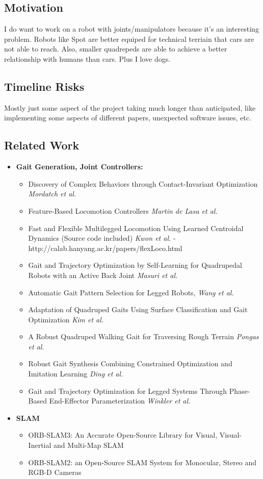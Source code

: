 \documentclass{article}
\theoremstyle{definition}
\theoremstyle{note}
\begin{document}
\subsection*{Motivation}
I do want to work on a robot with joints/manipulators because it's an interesting problem.
Robots like Spot are better equiped for technical terriain that cars are not able to reach. Also, 
smaller quadrepeds are able to achieve a better relationship with humans than cars.
Plus I love dogs.

\subsection*{Timeline Risks}
Mostly just some aspect of the project taking much longer than anticipated, like implementing some aspects
of different papers, unexpected software issues, etc.



\subsection*{Related Work}
\begin{itemize}
\item \textbf{Gait Generation, Joint Controllers:}
    \begin{itemize}
    \item Discovery of Complex Behaviors through Contact-Invariant Optimization \textit{Mordatch et al.}
    \item Feature-Based Locomotion Controllers \textit{Martin de Lasa et al.}
    \item Fast and Flexible Multilegged Locomotion Using Learned Centroidal Dynamics (Source code included) \textit{Kwon et al.} - http://calab.hanyang.ac.kr/papers/flexLoco.html
    \item Gait and Trajectory Optimization by Self-Learning for Quadrupedal Robots with an Active Back Joint \textit{Masuri et al.}
    \item Automatic  Gait  Pattern  Selection for  Legged  Robots, \textit{Wang et al.}
    \item Adaptation  of  Quadruped  Gaits  Using  Surface Classification  and  Gait  Optimization \textit{Kim et al.}
    \item A Robust Quadruped Walking Gait for  Traversing Rough Terrain \textit{Pongas et al.}
    \item Robust  Gait  Synthesis  Combining  Constrained  Optimization  and Imitation Learning \textit{Ding et al.}
    \item Gait and Trajectory Optimization for Legged Systems Through Phase-Based End-Effector Parameterization \textit{Winkler et al.}
    \end{itemize}
\item \textbf{SLAM} 
    \begin{itemize}
        \item ORB-SLAM3: An Accurate Open-Source Library for Visual, Visual-Inertial and Multi-Map SLAM
        \item ORB-SLAM2: an Open-Source SLAM System for Monocular, Stereo and RGB-D Cameras
    \end{itemize}
\end{itemize}
\end{document}
